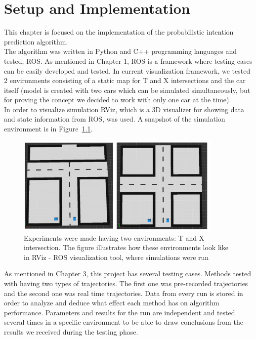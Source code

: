\chapter{Setup and Implementation}
\label{chap:3}
%
This chapter is focused on the implementation of the probabilistic intention prediction algorithm. \\
The algorithm was written in Python and C++ programming languages and tested, \gls{ROS}. As mentioned in Chapter 1, \gls{ROS} is a framework where testing cases can be easily developed and tested. In current visualization framework, we tested $2$ environments consisting of a static map for T and X intersections and the car itself (model is created with two cars which can be simulated simultaneously, but for proving the concept we decided to work with only one car at the time). \\
In order to visualize simulation \gls{RViz}, which is a 3D visualizer for showing data and state information from \gls{ROS}, was used. A snapshot of the simulation environment is in Figure~\ref{fig:ROS1}. 

\begin{figure}[H]
	\centering  	
	\includegraphics[width=10cm]{img/RosMaps.png}
	\caption{Experiments were made having two environments: T and X intersection. The figure illustrates how these  environments look like in \gls{RViz} - \gls{ROS} visualization tool, where simulations were run}
	\label{fig:ROS1}    
\end{figure}

As mentioned in Chapter 3, this project has several testing cases. Methods tested with having two types of trajectories. The first one was pre-recorded trajectories and the second one was real time trajectories. Data from every run is stored in order to analyze and deduce what effect each method has on algorithm performance. Parameters and results for the run are independent and tested several times in a specific environment to be able to draw conclusions from the results we received during the testing phase.

